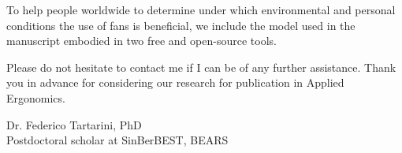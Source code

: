 \documentclass[11pt,a4paper,roman]{moderncv}        %
\begin{document}
To help people worldwide to determine under which environmental and personal conditions the use of fans is beneficial, we include the model used in the manuscript embodied in two free and open-source tools.

Please do not hesitate to contact me if I can be of any further assistance. Thank you in advance for considering our research for publication in Applied Ergonomics.

\bigskip

Dr. Federico Tartarini, PhD\\
Postdoctoral scholar at SinBerBEST, BEARS
\end{document}
